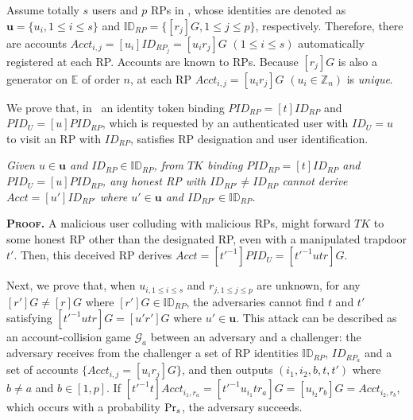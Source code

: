 
Assume totally $s$ users and $p$ RPs in \usso,
    whose identities are denoted as $\mathbf{u} = \{u_{i}, 1 \leq i \leq s\}$ and $\mathbb{ID}_{RP} = \{[r_{j}]G, 1 \leq j \leq p\}$, respectively.
Therefore, there are accounts $Acct_{i,j}=[u_i]ID_{RP_j} = [u_i r_j]G$ $(1 \leq i \leq s)$ automatically registered at each RP.
Accounts are known to RPs.
Because $[r_j]G$ is also a generator on $\mathbb{E}$ of order $n$,
    at each RP $Acct_{i,j}=[u_i r_j]G$ $(u_i \in \mathbb{Z}_n)$ is \emph{unique}.

We prove that, in \usso\ 
an identity token binding $PID_{RP} = [t]ID_{RP}$ and $PID_U = [u]PID_{RP}$, which is requested by an authenticated user with $ID_U =u$ to visit an RP with $ID_{RP}$,
    satisfies RP designation and user identification.

\begin{thm}[RP Designation]
\emph{Given $u \in \mathbf{u}$ and $ID_{RP} \in \mathbb{ID}_{RP}$,
from $TK$ binding $PID_{RP}=[t]ID_{RP}$ and $PID_U = [u]PID_{RP}$,
    any honest RP with ${ID_{RP'} \neq ID_{RP}}$ cannot derive $Acct = [u']ID_{RP'}$ where $u' \in \mathbf{u}$ and $ID_{RP'} \in \mathbb{ID}_{RP}$.}\label{thm-rp-designation}
\end{thm}

\noindent\textbf{\textsc{Proof.}} 
A malicious user colluding with malicious RPs,
    might forward $TK$ to some honest RP other than the designated RP,
        even with a manipulated trapdoor $t'$.
Then, this deceived RP derives $Acct = [t'^{-1}]PID_U = [t'^{-1}utr]G$.

Next, we prove that, when $u_{i, 1\leq i \leq s}$ and $r_{j, 1\leq j \leq p}$ are unknown,
    for any $[r']G \neq [r]G$ where $[r']G \in \mathbb{ID}_{RP}$,
    the adversaries cannot find $t$ and $t'$ satisfying $[t'^{-1}utr]G = [u'r']G$ where $u' \in \mathbf{u}$.
This attack can be described as an account-collision game $\mathcal{G}_a$ between an adversary and a challenger:
 the adversary receives from the challenger a set of RP identities $\mathbb{ID}_{RP}$,
  $ID_{RP_{a}}$ and a set of accounts $\{Acct_{i,j}= [u_ir_j]G\}$,
 and then outputs $(i_1, i_2, b, t, t')$ where $b \neq a$ and $b \in [1,p]$.
If $[t'^{-1}t]Acct_{i_1,r_a} = [t'^{-1}u_{i_1}tr_{a}]G = [u_{i_2}r_{b}]G = Acct_{i_2,r_b}$, which occurs with a probability ${\rm Pr}_s$, the adversary succeeds.

